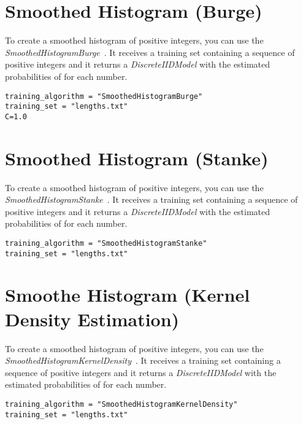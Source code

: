 \section{Smoothed Histogram (Burge)}

To create a smoothed histogram of positive integers, you can use the \textit{SmoothedHistogramBurge}~\cite{Burge1997}. It receives a training set containing a sequence of positive integers and it returns a \textit{DiscreteIIDModel} with the estimated probabilities of for each number.

\begin{Verbatim}[frame=single, label=train.txt]
training_algorithm = "SmoothedHistogramBurge"
training_set = "lengths.txt"
C=1.0
\end{Verbatim}

\section{Smoothed Histogram (Stanke)}


To create a smoothed histogram of positive integers, you can use the \textit{SmoothedHistogramStanke}~\cite{Stanke2003b}. It receives a training set containing a sequence of positive integers and it returns a \textit{DiscreteIIDModel} with the estimated probabilities of for each number.

\begin{Verbatim}[frame=single, label=train.txt]
training_algorithm = "SmoothedHistogramStanke"
training_set = "lengths.txt"
\end{Verbatim}


\section{Smoothe Histogram (Kernel Density Estimation)}

To create a smoothed histogram of positive integers, you can use the \textit{SmoothedHistogramKernelDensity}~\cite{Sheather2004}. It receives a training set containing a sequence of positive integers and it returns a \textit{DiscreteIIDModel} with the estimated probabilities of for each number.

\begin{Verbatim}[frame=single, label=train.txt]
training_algorithm = "SmoothedHistogramKernelDensity"
training_set = "lengths.txt"
\end{Verbatim}


